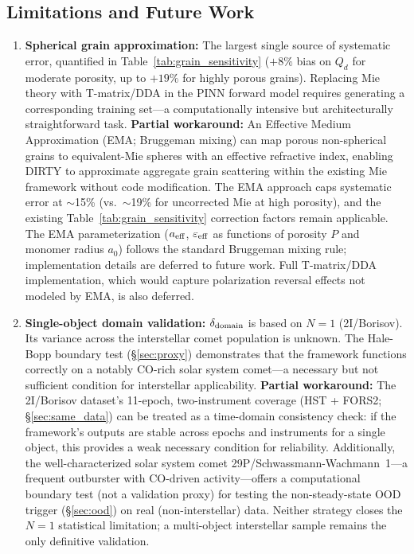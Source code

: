 \documentclass[usenatbib]{mnras}
\begin{document}
\subsection{Limitations and Future Work}\label{sec:limitations}

\begin{enumerate}
    \item \textbf{Spherical grain approximation:} The largest single source of systematic error, quantified in Table~\ref{tab:grain_sensitivity} ($+8\%$ bias on $Q_d$ for moderate porosity, up to $+19\%$ for highly porous grains). Replacing Mie theory with T-matrix/DDA in the PINN forward model requires generating a corresponding training set---a computationally intensive but architecturally straightforward task. \textbf{Partial workaround:} An Effective Medium Approximation (EMA; Bruggeman mixing) can map porous non-spherical grains to equivalent-Mie spheres with an effective refractive index, enabling DIRTY to approximate aggregate grain scattering within the existing Mie framework without code modification. The EMA approach caps systematic error at $\sim$15\% (vs.\ $\sim$19\% for uncorrected Mie at high porosity), and the existing Table~\ref{tab:grain_sensitivity} correction factors remain applicable. The EMA parameterization ($a_{\rm eff}$, $\varepsilon_{\rm eff}$ as functions of porosity $P$ and monomer radius $a_0$) follows the standard Bruggeman mixing rule; implementation details are deferred to future work. Full T-matrix/DDA implementation, which would capture polarization reversal effects not modeled by EMA, is also deferred.
    \item \textbf{Single-object domain validation:} $\delta_{\rm domain}$ is based on $N=1$ (2I/Borisov). Its variance across the interstellar comet population is unknown. The Hale-Bopp boundary test (\S\ref{sec:proxy}) demonstrates that the framework functions correctly on a notably CO-rich solar system comet---a necessary but not sufficient condition for interstellar applicability. \textbf{Partial workaround:} The 2I/Borisov dataset's 11-epoch, two-instrument coverage (HST + FORS2; \S\ref{sec:same_data}) can be treated as a time-domain consistency check: if the framework's outputs are stable across epochs and instruments for a single object, this provides a weak necessary condition for reliability. Additionally, the well-characterized solar system comet 29P/Schwassmann-Wachmann~1---a frequent outburster with CO-driven activity---offers a computational boundary test (not a validation proxy) for testing the non-steady-state OOD trigger (\S\ref{sec:ood}) on real (non-interstellar) data. Neither strategy closes the $N=1$ statistical limitation; a multi-object interstellar sample remains the only definitive validation.

\end{enumerate}
\end{document}
